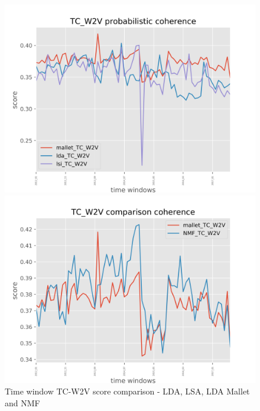 \begin{figure}[!ht]
  \centering
  \begin{minipage}[b]{0.45\textwidth}
    \includegraphics[width=\textwidth]{img/TC_W2V_probabilistic_all_coherence_plot.png}
  \end{minipage}
  \hfill
  \begin{minipage}[b]{0.45\textwidth}
    \includegraphics[width=\textwidth]{img/TC_W2V_comparison_all_coherence_plot.png}
  \end{minipage}
  \caption{Time window TC-W2V score comparison - LDA, LSA, LDA Mallet and NMF}
  \label{fig:window_TC_W2V_coherence_all}
\end{figure}

